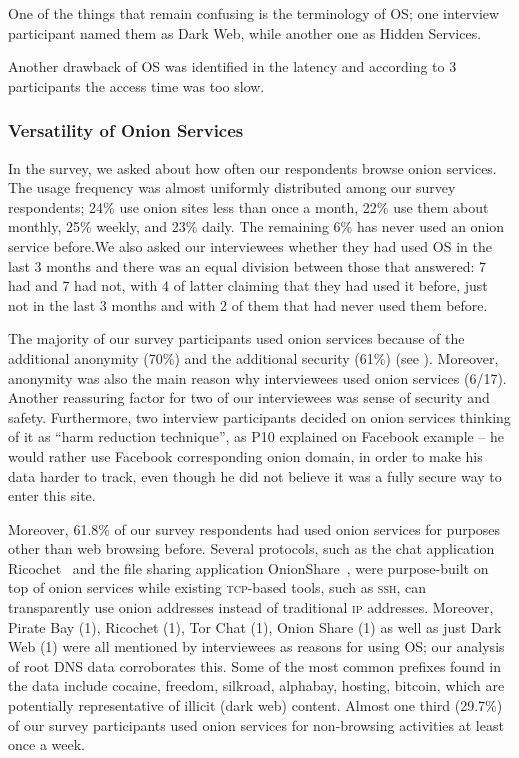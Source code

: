 One of the things that remain confusing is the terminology of OS; one interview participant named them as Dark Web, while another one as Hidden Services.  

 Another drawback of OS was identified in the latency and according to 3 participants the access time was too slow. 
 
\subsubsection{Versatility of Onion Services }
In the survey, we asked about how often our respondents browse onion
services.  The usage frequency was almost uniformly distributed among our survey
respondents; 24\% use onion sites less than once a month, 22\% use them about
monthly, 25\% weekly, and 23\% daily.  The remaining 6\% has never used an onion
service before.We also asked our interviewees whether they had used OS in the last 3 months and there was an equal division between those that answered: 7 had and 7 had not, with 4 of latter claiming that they had used it before, just not in the last 3 months and with 2 of them that had never used them before.

The majority of our survey participants  used onion services
because of the additional anonymity (70\%) and the additional security (61\%) (see ). Moreover,  anonymity was also the main reason why interviewees used onion services (6/17). Another reassuring factor for two of our interviewees was sense of security and safety. Furthermore, two interview participants decided on onion services thinking of it as “harm reduction technique”, as P10 explained on Facebook example – he would rather use Facebook corresponding onion domain, in order to make his data harder to track, even though he did not believe it was a fully secure way to enter this site.

Moreover, 61.8\% of our survey respondents had used onion services for purposes
other than web browsing before.  Several protocols, such as the chat application
Ricochet~\cite{ricochet} and the file sharing application
OnionShare~\cite{onionshare}, were purpose-built on top of onion services while
existing \textsc{tcp}-based tools, such as \textsc{ssh}, can transparently use
onion addresses instead of traditional \textsc{ip} addresses.  Moreover, Pirate Bay (1), Ricochet (1), Tor Chat (1), Onion Share (1) as well as just Dark Web (1) were all mentioned by interviewees as reasons for using OS; our analysis of root DNS data corroborates this.  Some of the most common prefixes found in the data include cocaine, freedom, silkroad, alphabay, hosting, bitcoin, which are potentially representative of illicit (dark web) content. Almost one third
(29.7\%) of our survey participants used onion services for non-browsing activities at
least once a week. 


